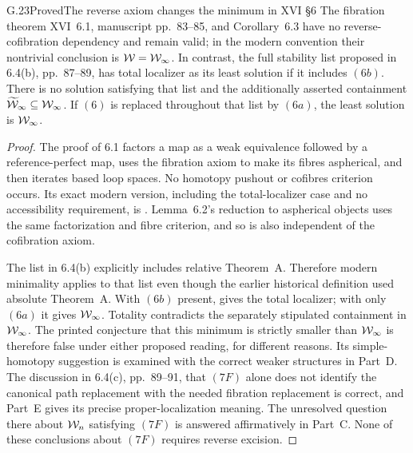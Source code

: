 \begin{claim}{G.23}{Proved}{The reverse axiom changes the minimum in XVI \S6}
The fibration theorem XVI~6.1, manuscript pp.~83--85, and Corollary~6.3 have no reverse-cofibration dependency and remain valid; in the modern convention their nontrivial conclusion is $\mathcal{W}=\mathcal{W}_{\infty}$. In contrast, the full stability list proposed in 6.4(b), pp.~87--89, has total localizer as its least solution if it includes $(6b)$. There is no solution satisfying that list and the additionally asserted containment $\widetilde{\mathcal{W}}_\infty\subseteq\mathcal{W}_{\infty}$. If $(6)$ is replaced throughout that list by $(6a)$, the least solution is $\mathcal{W}_{\infty}$.
\end{claim}
\begin{proof}
The proof of 6.1 factors a map as a weak equivalence followed by a reference-perfect map, uses the fibration axiom to make its fibres aspherical, and then iterates based loop spaces. No homotopy pushout or cofibres criterion occurs. Its exact modern version, including the total-localizer case and no accessibility requirement, is . Lemma~6.2's reduction to aspherical objects uses the same factorization and fibre criterion, and so is also independent of the cofibration axiom.

The list in 6.4(b) explicitly includes relative Theorem~A. Therefore modern minimality applies to that list even though the earlier historical definition used absolute Theorem~A. With $(6b)$ present,  gives the total localizer; with only $(6a)$ it gives $\mathcal{W}_{\infty}$. Totality contradicts the separately stipulated containment in $\mathcal{W}_{\infty}$. The printed conjecture that this minimum is strictly smaller than $\mathcal{W}_{\infty}$ is therefore false under either proposed reading, for different reasons. Its simple-homotopy suggestion is examined with the correct weaker structures in Part~D. The discussion in 6.4(c), pp.~89--91, that $(7F)$ alone does not identify the canonical path replacement with the needed fibration replacement is correct, and Part~E gives its precise proper-localization meaning. The unresolved question there about $\mathcal{W}_n$ satisfying $(7F)$ is answered affirmatively in Part~C. None of these conclusions about $(7F)$ requires reverse excision.
\end{proof}

